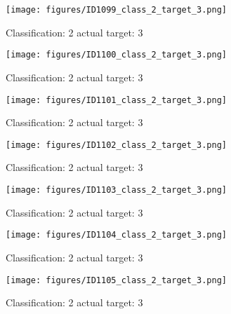 \begin{figure}[h!]
\begin{center}
\texttt{[image: figures/ID1099\_class\_2\_target\_3.png]}
\end{center}
\caption{ Classification: 2 actual target: 3}
\label{fig:ID1099_class_2_target_3}
\end{figure}
\begin{figure}[h!]
\begin{center}
\texttt{[image: figures/ID1100\_class\_2\_target\_3.png]}
\end{center}
\caption{ Classification: 2 actual target: 3}
\label{fig:ID1100_class_2_target_3}
\end{figure}
\begin{figure}[h!]
\begin{center}
\texttt{[image: figures/ID1101\_class\_2\_target\_3.png]}
\end{center}
\caption{ Classification: 2 actual target: 3}
\label{fig:ID1101_class_2_target_3}
\end{figure}
\begin{figure}[h!]
\begin{center}
\texttt{[image: figures/ID1102\_class\_2\_target\_3.png]}
\end{center}
\caption{ Classification: 2 actual target: 3}
\label{fig:ID1102_class_2_target_3}
\end{figure}
\begin{figure}[h!]
\begin{center}
\texttt{[image: figures/ID1103\_class\_2\_target\_3.png]}
\end{center}
\caption{ Classification: 2 actual target: 3}
\label{fig:ID1103_class_2_target_3}
\end{figure}
\begin{figure}[h!]
\begin{center}
\texttt{[image: figures/ID1104\_class\_2\_target\_3.png]}
\end{center}
\caption{ Classification: 2 actual target: 3}
\label{fig:ID1104_class_2_target_3}
\end{figure}
\begin{figure}[h!]
\begin{center}
\texttt{[image: figures/ID1105\_class\_2\_target\_3.png]}
\end{center}
\caption{ Classification: 2 actual target: 3}
\label{fig:ID1105_class_2_target_3}
\end{figure}
